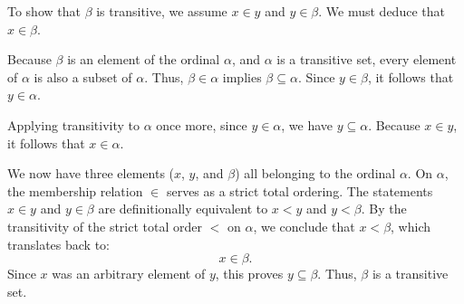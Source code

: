 
To show that $\beta$ is transitive, we assume $x \in y$ and $y \in \beta$. We must deduce that $x \in \beta$.

Because $\beta$ is an element of the ordinal $\alpha$, and $\alpha$ is a transitive set, every element of $\alpha$ is also a subset of $\alpha$. Thus, $\beta \in \alpha$ implies $\beta \subseteq \alpha$. Since $y \in \beta$, it follows that $y \in \alpha$. 

Applying transitivity to $\alpha$ once more, since $y \in \alpha$, we have $y \subseteq \alpha$. Because $x \in y$, it follows that $x \in \alpha$.

We now have three elements ($x$, $y$, and $\beta$) all belonging to the ordinal $\alpha$. On $\alpha$, the membership relation $\in$ serves as a strict total ordering. The statements $x \in y$ and $y \in \beta$ are definitionally equivalent to $x < y$ and $y < \beta$. By the transitivity of the strict total order $<$ on $\alpha$, we conclude that $x < \beta$, which translates back to:
\[
x \in \beta.
\]
Since $x$ was an arbitrary element of $y$, this proves $y \subseteq \beta$. Thus, $\beta$ is a transitive set.